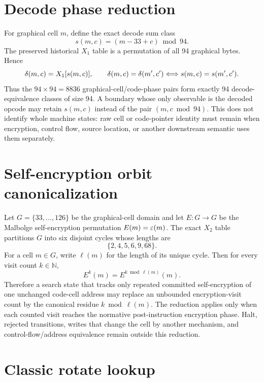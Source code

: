 \documentclass{article}
\begin{document}
\section{Decode phase reduction}

For graphical cell $m$, define the exact decode sum class
\[
  s(m,c)=(m-33+c)\bmod94.
\]
The preserved historical $X_1$ table is a permutation of all 94 graphical
bytes. Hence
\begin{equation}
  \delta(m,c)=X_1[s(m,c)],
  \qquad
  \delta(m,c)=\delta(m',c')
  \Longleftrightarrow s(m,c)=s(m',c').
  \label{eq:optimization-decode-phase}
\end{equation}
Thus the $94\times94=8836$ graphical-cell/code-phase pairs form exactly 94
decode-equivalence classes of size 94. A boundary whose only observable is the
decoded opcode may retain $s(m,c)$ instead of the pair $(m,c\bmod94)$. This does
not identify whole machine states: raw cell or code-pointer identity must remain
when encryption, control flow, source location, or another downstream semantic
uses them separately.


\section{Self-encryption orbit canonicalization}

Let $G=\{33,\ldots,126\}$ be the graphical-cell domain and let
$E:G\to G$ be the Malbolge self-encryption permutation $E(m)=\varepsilon(m)$.
The exact $X_2$ table partitions $G$ into six disjoint cycles whose lengths are
\[
  \{2,4,5,6,9,68\}.
\]
For a cell $m\in G$, write $\ell(m)$ for the length of its unique cycle. Then
for every visit count $k\in\mathbb{N}$,
\begin{equation}
  E^k(m)=E^{k\bmod\ell(m)}(m).
  \label{eq:optimization-encryption-orbit}
\end{equation}
Therefore a search state that tracks only repeated committed self-encryption of
one unchanged code-cell address may replace an unbounded encryption-visit count
by the canonical residue $k\bmod\ell(m)$. The reduction applies only when each
counted visit reaches the normative post-instruction encryption phase. Halt,
rejected transitions, writes that change the cell by another mechanism, and
control-flow/address equivalence remain outside this reduction.

\section{Classic rotate lookup}
\end{document}
